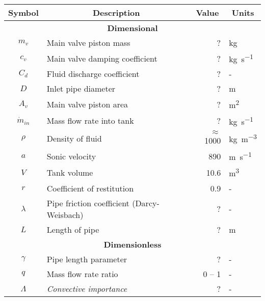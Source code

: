 \begin{table}[ht]
    \centering
    \begin{tabular}{c|l|r|l}
        \large \textbf{Symbol} &  \multicolumn{1}{c}{\large \textbf{Description}} & \multicolumn{1}{|c}{\large \textbf{Value}} & \multicolumn{1}{|c}{\large \textbf{Units}} \\ \hline \hline
        \multicolumn{4}{c}{\textbf{Dimensional}} \\ \hline
        $m_v$ & Main valve piston mass & ? & \si{kg} \\ \hline %
        $c_v$ & Main valve damping coefficient & ? & \si{kg.s^{-1}} \\ \hline %
        $C_d$ & Fluid discharge coefficient & ? & - \\ \hline %
        $D$ & Inlet pipe diameter & ? & \si{m} \\ \hline %
        $A_v$ & Main valve piston area & ? & \si{m^2} \\ \hline
        $\dot{m}_{in}$ & Mass flow rate into tank & ? & \si{kg.s^{-1}} \\ \hline %
        $\rho$ & Density of fluid & $\approx$1000 & \si{kg.m^{-3}} \\ \hline %
        $a$ & Sonic velocity & 890 & \si{m.s^{-1}} \\ \hline %
        $V$ & Tank volume & 10.6 & \si{m^3} \\ \hline %
        $r$ & Coefficient of restitution & 0.9 & - \\ \hline %
        $\lambda$ & Pipe friction coefficient (Darcy-Weisbach) & ? & - \\ \hline %
        $L$ & Length of pipe & ? & \si{m} \\ \hline \hline %
        \multicolumn{4}{c}{\textbf{Dimensionless}} \\ \hline
        $\gamma$ & Pipe length parameter & ? & - \\ \hline
        $q$ & Mass flow rate ratio & 0 -- 1 & - \\ \hline
        $\Lambda$ & \textit{Convective importance} & ? & - \\ \hline

\end{tabular}
\end{table}

